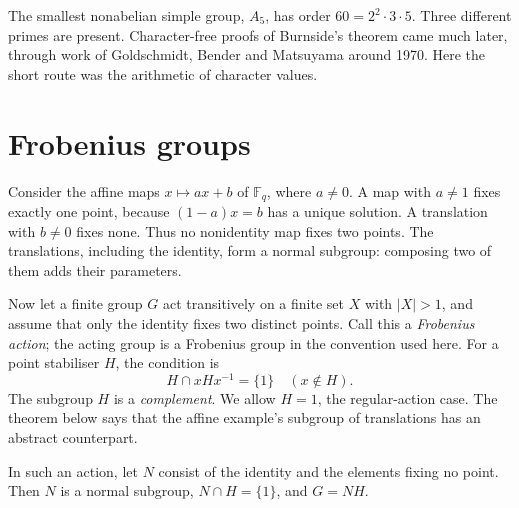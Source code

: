 The smallest nonabelian simple group, $A_5$, has order $60=2^2\cdot3\cdot5$. Three different primes are present. Character-free proofs of Burnside's theorem came much later, through work of Goldschmidt, Bender and Matsuyama around 1970. Here the short route was the arithmetic of character values.

\section{Frobenius groups}

Consider the affine maps $x\mapsto ax+b$ of $\mathbb F_q$, where $a\ne0$. A map with $a\ne1$ fixes exactly one point, because $(1-a)x=b$ has a unique solution. A translation with $b\ne0$ fixes none. Thus no nonidentity map fixes two points. The translations, including the identity, form a normal subgroup: composing two of them adds their parameters.

Now let a finite group $G$ act transitively on a finite set $X$ with $|X|>1$, and assume that only the identity fixes two distinct points. Call this a \emph{Frobenius action}; the acting group is a Frobenius group in the convention used here. For a point stabiliser $H$, the condition is
\[
H\cap xHx^{-1}=\{1\}\quad(x\notin H).
\]
The subgroup $H$ is a \emph{complement}. We allow $H=1$, the regular-action case. The theorem below says that the affine example's subgroup of translations has an abstract counterpart.

\begin{theorem}[Frobenius, 1901]\label{thm:frobeniuskernel}
In such an action, let $N$ consist of the identity and the elements fixing no point. Then $N$ is a normal subgroup, $N\cap H=\{1\}$, and $G=NH$.
\end{theorem}

